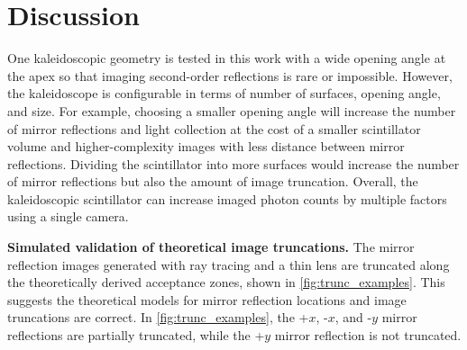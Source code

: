 \section{Discussion}

One kaleidoscopic geometry is tested in this work with a wide opening angle at the 
apex so that imaging second-order reflections is rare or impossible. 
However, the kaleidoscope is configurable in terms of number of surfaces, opening 
angle, and size.
For example, choosing a smaller opening angle will increase the number of mirror 
reflections and light collection at the cost of a smaller scintillator volume and 
higher-complexity images with less distance between mirror reflections.
Dividing the scintillator into more surfaces would increase the number of mirror 
reflections but also the amount of image truncation.
Overall, the kaleidoscopic scintillator can increase imaged photon counts by 
multiple factors using a single camera.


\noindent
\textbf{Simulated validation of theoretical image truncations.}
The mirror reflection images generated with ray tracing and a thin lens are 
truncated along the theoretically derived acceptance zones, shown in \cref{fig:trunc_examples}. 
This suggests the theoretical models for mirror reflection locations and 
image truncations are correct.
In \cref{fig:trunc_examples}, the +$x$, -$x$, and -$y$ mirror reflections are 
partially truncated, while the +$y$ mirror reflection is not truncated.

